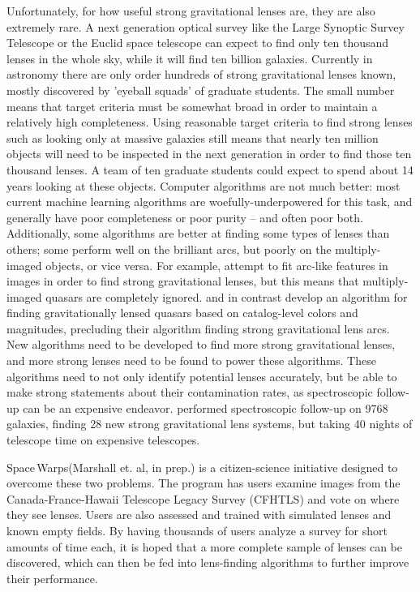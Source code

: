\documentclass[10pt,twocolumn,letterpaper]{article}
\begin{document}
Unfortunately, for how useful strong gravitational lenses are, they are also
extremely rare. A next generation optical survey like the Large Synoptic Survey
Telescope or the Euclid space telescope can expect to find only ten thousand
lenses in the whole sky, while it will find ten billion galaxies.
\cite{Serjeant:2014aa} Currently in astronomy there are only order hundreds of
strong gravitational lenses known, mostly discovered by 'eyeball squads' of
graduate students. The small number means that target criteria must be somewhat
broad in order to maintain a relatively high completeness. Using reasonable
target criteria to find strong lenses such as looking only at massive galaxies
still means that nearly ten million objects will need to be inspected in the
next generation in order to find those ten thousand lenses. A team of ten
graduate students could expect to spend about 14 years looking at these
objects. Computer algorithms are not much better: most current machine learning
algorithms are woefully-underpowered for this task, and generally have poor
completeness or poor purity -- and often poor both. Additionally, some
algorithms are better at finding some types of lenses than others; some perform
well on the brilliant arcs, but poorly on the multiply-imaged objects, or vice
versa. For example, \cite{Kubo:2008aa} attempt to fit arc-like features in
images in order to find strong gravitational lenses, but this means that
multiply-imaged quasars are completely ignored. \cite{Agnello:2015aa} and
\cite{Chan:2014aa} in contrast develop an algorithm for finding gravitationally
lensed quasars based on catalog-level colors and magnitudes, precluding their
algorithm finding strong gravitational lens arcs. New algorithms need to be
developed to find more strong gravitational lenses, and more strong lenses need
to be found to power these algorithms. These algorithms need to not only
identify potential lenses accurately, but be able to make strong statements
about their contamination rates, as spectroscopic follow-up can be an expensive
endeavor. \cite{Momcheva:2015aa} performed spectroscopic follow-up on 9768
galaxies, finding 28 new strong gravitational lens systems, but taking 40
nights of telescope time on expensive telescopes.

{\sc Space\,Warps}\xspace (Marshall et. al, in prep.) is a citizen-science
initiative designed to overcome these two problems. The program has users
examine images from the Canada-France-Hawaii Telescope Legacy Survey (CFHTLS)
and vote on where they see lenses. Users are also assessed and trained with
simulated lenses and known empty fields. By having thousands of users analyze a
survey for short amounts of time each, it is hoped that a more complete sample
of lenses can be discovered, which can then be fed into lens-finding algorithms
to further improve their performance.
\end{document}
